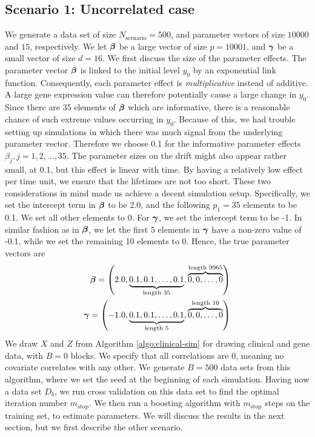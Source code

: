 \subsection{Scenario 1: Uncorrelated case}
We generate a data set of size $N_{\text{scenario}}=500$, and parameter vectors of size $10000$ and $15$, respectively.
We let $\boldsymbol{\beta}$ be a large vector of size $p=10001$, and $\boldsymbol{\gamma}$ be a small vector of size $d=16$.
We first discuss the size of the parameter effects.
The parameter vector $\boldsymbol{\beta}$ is linked to the initial level $y_0$ by an exponential link function.
Consequently, each parameter effect is \textit{multiplicative} instead of additive.
A large gene expression value can therefore potentially cause a large change in $y_0$.
Since there are 35 elements of $\boldsymbol{\beta}$ which are informative, there is a reasonable chance of such extreme values occurring in $y_0$.
Because of this, we had trouble setting up simulations in which there was much signal from the underlying parameter vector.
Therefore we choose 0.1 for the informative parameter effects $\beta_j,j=1,2,\ldots,35$.
The parameter sizes on the drift might also appear rather small, at 0.1, but this effect is linear with time.
By having a relatively low effect per time unit, we ensure that the lifetimes are not too short.
These two considerations in mind made us achieve a decent simulation setup.
Specifically, we set the intercept term in $\boldsymbol{\beta}$ to be 2.0, and the following $p_1=35$ elements to be 0.1.
We set all other elements to 0.
For $\boldsymbol{\gamma}$, we set the intercept term to be -1.
In similar fashion as in $\boldsymbol{\beta}$, we let the first 5 elements in $\boldsymbol{\gamma}$ have a non-zero value of -0.1, while we set the remaining 10 elements to 0.
Hence, the true parameter vectors are
\begin{align*}
    \boldsymbol{\beta}=\left(2.0, \underbrace{0.1, 0.1, \ldots, 0.1}_{\text{length 35}}, \overbrace{0, 0, \ldots, 0}^{\text{length 9965}}\right) \\
    \boldsymbol{\gamma}=\left(-1.0, \underbrace{0.1, 0.1, \ldots, 0.1}_{\text{length 5}}, \overbrace{0, 0, \ldots, 0}^{\text{length 10}}\right)
\end{align*}
We draw $X$ and $Z$ from Algorithm \ref{algo:clinical-sim} for drawing clinical and gene data, with $B=0$ blocks.
We specify that all correlations are 0, meaning no covariate correlates with any other.
We generate $B=500$ data sets from this algorithm, where we set the seed at the beginning of each simulation.
Having now a data set $D_b$, we run cross validation on this data set to find the optimal iteration number $m_{\text{stop}}$.
We then run a boosting algorithm with $m_{\text{stop}}$ steps on the training set, to estimate parameters.
We will discuss the results in the next section, but we first describe the other scenario.

